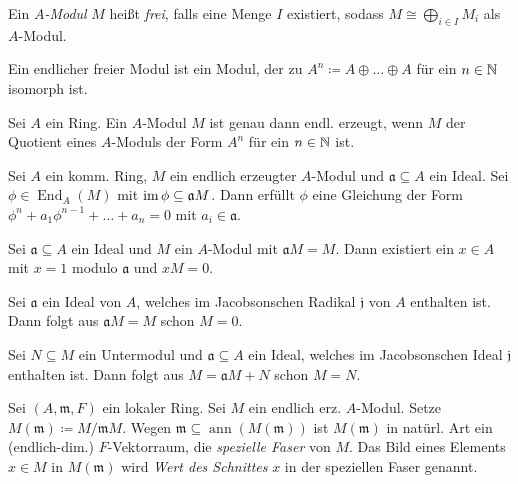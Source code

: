\documentclass{cheat-sheet}
\DeclareMathOperator{\ann}{ann} %
\DeclareMathOperator{\End}{End} %
\newcommand{\aaa}{\mathfrak{a}}
\newcommand{\jjj}{\mathfrak{j}}
\newcommand{\mmm}{\mathfrak{m}}
\begin{document}

\begin{defn}
  Ein \emph{$A$-Modul} $M$ heißt \emph{frei}, falls eine Menge $I$ existiert, sodass $M \cong {\bigoplus}_{i \in I} M_i$ als $A$-Modul.
\end{defn}

\begin{bem}
  Ein endlicher freier Modul ist ein Modul, der zu $A^n \coloneqq A \oplus \ldots \oplus A$ für ein $n \in \mathbb{N}$ isomorph ist.
\end{bem}

\begin{prop}
  Sei $A$ ein Ring. Ein $A$-Modul $M$ ist genau dann endl. erzeugt, wenn $M$ der Quotient eines $A$-Moduls der Form $A^n$ für ein $n \in \mathbb{N}$ ist.
\end{prop}


\begin{prop}
  Sei $A$ ein komm. Ring, $M$ ein endlich erzeugter $A$-Modul und $\aaa \subseteq A$ ein Ideal.
  Sei $\phi \in \End_A(M)$ mit $\im \phi \subseteq \aaa M$.
  Dann erfüllt $\phi$ eine Gleichung der Form $\phi^n + a_1 \phi^{n-1} + \ldots + a_n = 0$ mit $a_i \in \aaa$.
\end{prop}

\begin{kor}
  Sei $\aaa \subseteq A$ ein Ideal und $M$ ein $A$-Modul mit $\aaa M = M$.
  Dann existiert ein $x \in A$ mit $x = 1$ modulo $\aaa$ und $x M = 0$.
\end{kor}

\begin{lem}
  Sei $\aaa$ ein Ideal von $A$, welches im Jacobsonschen Radikal $\jjj$ von $A$ enthalten ist.
  Dann folgt aus $\aaa M = M$ schon $M = 0$.
\end{lem}

\begin{kor}
  Sei $N \subseteq M$ ein Untermodul und $\aaa \subseteq A$ ein Ideal, welches im Jacobsonschen Ideal $\jjj$ enthalten ist.
  Dann folgt aus $M = \aaa M + N$ schon $M = N$.
\end{kor}

\begin{defn}
  Sei $(A, \mmm, F)$ ein lokaler Ring.
  Sei $M$ ein endlich erz. $A$-Modul.
  Setze $M(\mmm) \coloneqq M/\mmm M$.
  Wegen $\mmm \subseteq \ann(M(\mmm))$ ist $M(\mmm)$ in natürl. Art ein (endlich-dim.) $F$-Vektorraum, die \emph{spezielle Faser} von $M$.
  Das Bild eines Elements $x \in M$ in $M(\mmm)$ wird \emph{Wert des Schnittes} $x$ in der speziellen Faser genannt.
\end{defn}
\end{document}
